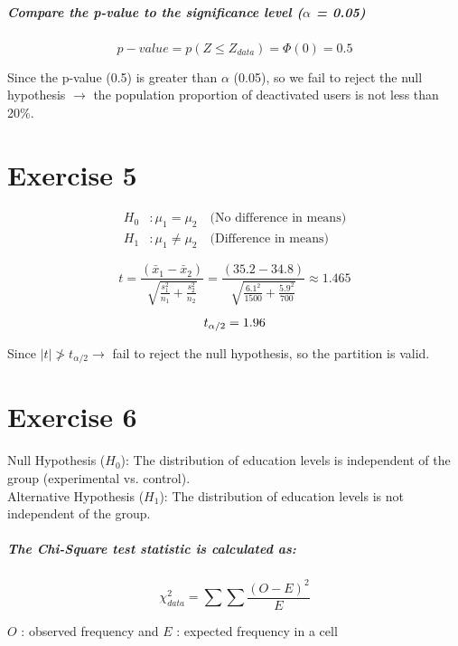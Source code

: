 \documentclass[12pt]{article}
\begin{document}
	\subparagraph{Compare the p-value to the significance level ($\alpha$ = 0.05)}
	\[
	p-value=p(Z \leq Z_{data})=\Phi(0)=0.5
	\]
	
	
	Since the p-value (0.5) is greater than $\alpha$ (0.05), so we fail to reject the null hypothesis $\rightarrow$  the population proportion of deactivated users is not less than 20\%.
	
	\section{Exercise 5}

		\begin{align*}
			H_0 &: \mu_1 = \mu_2 \quad \text{(No difference in means)} \\
			H_1 &: \mu_1 \neq \mu_2 \quad \text{(Difference in means)}
		\end{align*}

		\[
		t = \frac{(\bar{x}_1 - \bar{x}_2)}{\sqrt{\frac{s_1^2}{n_1} + \frac{s_2^2}{n_2}}} = \frac{(35.2 - 34.8)}{\sqrt{\frac{6.1^2}{1500} + \frac{5.9^2}{700}}} \approx 1.465
		\]		
		
		\[
		t_{\alpha/2}=1.96 \\
		\]
		
		Since $|t| \not> t_{\alpha/2} \rightarrow$  fail to reject the null hypothesis, so the partition is valid.


	\section{Exercise 6}
	Null Hypothesis ($H_{0}$): The distribution of education levels is independent of the group (experimental vs. control).\\
	Alternative Hypothesis ($H_{1}$): The distribution of education levels is not independent of the group.
	

	\subparagraph{The Chi-Square test statistic is calculated as:}
	
	\[
	\chi^2_{data} = \sum \sum \frac{(O - E)^2}{E}
	\]
	
	 $O$ : observed frequency and $E$ : expected frequency in a cell
\end{document}
